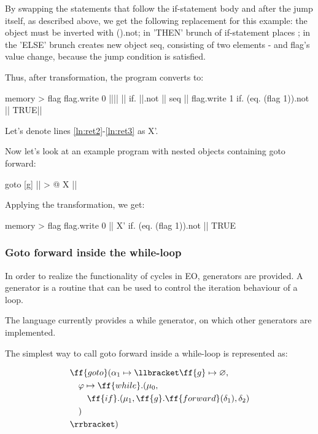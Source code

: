 \documentclass[sigplan,review,11pt,nonacm,natbib=false]{acmart}
\begin{document}
By swapping the statements that follow the if-statement body and after the jump itself, as described above, we get the following replacement for this example: the  object must be inverted with ().not; in 'THEN' brunch of if-statement places ; in the 'ELSE' brunch creates new object seq, consisting of two elements -  and flag's value change, because the jump condition is satisfied.

Thus, after transformation, the program converts to:
\begin{ffcode}
memory > flag
flag.write 0
|||$\label{ln:ret2}$|
  ||
  if.
    ||.not
    ||
    seq
      ||
      flag.write 1
  if.
    (eq. (flag 1)).not
    ||
    TRUE|$\label{ln:ret3}$|
\end{ffcode}

Let's denote lines \ref{ln:ret2}-\ref{ln:ret3} as X'.

Now let's look at an example program with nested objects containing goto forward:
\begin{ffcode}
goto
  [g]
    || > @
      X
      ||
\end{ffcode}

Applying the transformation, we get:
\begin{ffcode}
memory > flag
flag.write 0
||
  X'
  if.
    (eq. (flag 1)).not
    ||
    TRUE
\end{ffcode}


\subsubsection{Goto forward inside the while-loop}
In order to realize the functionality of cycles in EO, generators are provided. A generator is a routine that can be used to control the iteration behaviour of a loop.

The language currently provides a while generator, on which other generators are implemented.

The simplest way to call goto forward inside a while-loop is represented as:

\begin{equation}
\begin{split}
& \ff{goto} ( \alpha_1 \mapsto \llbracket \ff{g} \mapsto \varnothing, \\
& \quad \varphi \mapsto \ff{while}.(\mu_0, \\
& \quad \quad \ff{if}.(\mu_1, \ff{g}.\ff{forward}(\delta_1), \delta_2) \\
& \quad ) \\
& \rrbracket) \\
\end{split}
\end{equation}
\end{document}

